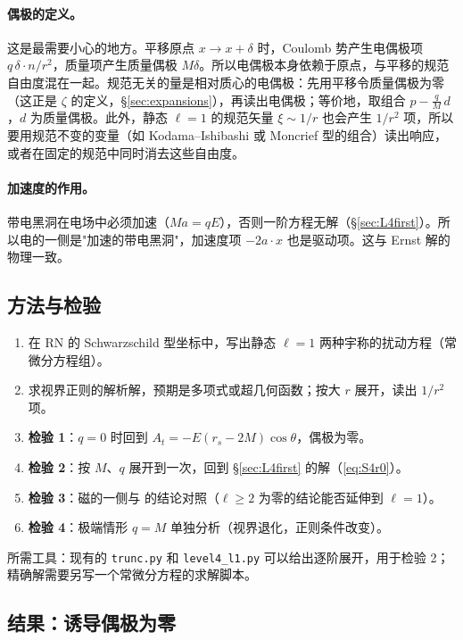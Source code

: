 \documentclass[11pt,a4paper]{ctexart}
\numberwithin{equation}{section}
\begin{document}
\paragraph{偶极的定义。}这是最需要小心的地方。平移原点 $x\to x+\delta$ 时，Coulomb 势产生电偶极项 $q\,\delta\cdot n/r^2$，质量项产生质量偶极 $M\delta$。所以电偶极本身依赖于原点，与平移的规范自由度混在一起。规范无关的量是相对质心的电偶极：先用平移令质量偶极为零（这正是 $\zeta$ 的定义，\S\ref{sec:expansions}），再读出电偶极；等价地，取组合 $p-\tfrac qM\,d$，$d$ 为质量偶极。此外，静态 $\ell=1$ 的规范矢量 $\xi\sim1/r$ 也会产生 $1/r^2$ 项，所以要用规范不变的变量（如 Kodama--Ishibashi 或 Moncrief 型的组合）读出响应，或者在固定的规范中同时消去这些自由度。

\paragraph{加速度的作用。}带电黑洞在电场中必须加速（$Ma=qE$），否则一阶方程无解（\S\ref{sec:L4first}）。所以电的一侧是"加速的带电黑洞"，加速度项 $-2a\cdot x$ 也是驱动项。这与 Ernst 解的物理一致。

\subsection{方法与检验}

\begin{enumerate}
\item 在 RN 的 Schwarzschild 型坐标中，写出静态 $\ell=1$ 两种宇称的扰动方程（常微分方程组）。
\item 求视界正则的解析解，预期是多项式或超几何函数；按大 $r$ 展开，读出 $1/r^2$ 项。
\item \textbf{检验 1}：$q=0$ 时回到 $A_t=-E(r_s-2M)\cos\theta$，偶极为零。
\item \textbf{检验 2}：按 $M$、$q$ 展开到一次，回到 \S\ref{sec:L4first} 的解（\eqref{eq:S4r0}）。
\item \textbf{检验 3}：磁的一侧与 \citet{PereniguezCardoso2022} 的结论对照（$\ell\geq2$ 为零的结论能否延伸到 $\ell=1$）。
\item \textbf{检验 4}：极端情形 $q=M$ 单独分析（视界退化，正则条件改变）。
\end{enumerate}
所需工具：现有的 \texttt{trunc.py} 和 \texttt{level4\_l1.py} 可以给出逐阶展开，用于检验 2；精确解需要另写一个常微分方程的求解脚本。

\subsection{结果：诱导偶极为零}
\label{sec:L5result}
\end{document}
